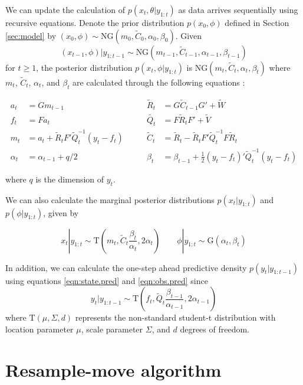\documentclass{article}
\begin{document}
We can update the calculation of $p(x_t,\theta|y_{1:t})$ as data arrives sequentially using recursive equations. Denote the prior distribution $p(x_0, \phi)$ defined in Section \ref{sec:model} by $(x_0, \phi) \sim \mbox{NG}(m_0, \tilde{C}_0, \alpha_0, \beta_0)$. Given \[(x_{t-1},\phi)|y_{1:t-1} \sim \mbox{NG}(m_{t-1},\tilde{C}_{t-1}, \alpha_{t-1}, \beta_{t-1})\]
\noindent for $t \ge 1$, the posterior distribution $p(x_t,\phi|y_{1:t})$ is $\mbox{NG}(m_t,\tilde{C}_t,\alpha_t,\beta_t)$ where $m_t$, $\tilde{C}_t$, $\alpha_t$, and $\beta_t$ are calculated through the following equations \citep{petris2009dynamic}:

\begin{align}
a_t &= Gm_{t-1} &\qquad \tilde{R}_t &= G\tilde{C}_{t-1}G' + \tilde{W} \label{eqn:state.pred} \\
f_t &= Fa_t &\qquad \tilde{Q_t} &= F\tilde{R}_tF' + \tilde{V} \label{eqn:obs.pred} \\
m_t &= a_t + \tilde{R}_tF'\tilde{Q}_t^{-1}(y_t-f_t) &\qquad \tilde{C}_t &= \tilde{R}_t - \tilde{R}_tF'\tilde{Q}_t^{-1}F\tilde{R}_t \\
\alpha_t &= \alpha_{t-1} + q / 2 &\qquad \beta_t &= \beta_{t-1} + \frac{1}{2}(y_t-f_t)'\tilde{Q}_t^{-1}(y_t-f_t)
\end{align}

\noindent where $q$ is the dimension of $y_t$.

We can also calculate the marginal posterior distributions $p(x_t|y_{1:t})$ and $p(\phi|y_{1:t})$, given by

\begin{equation}
x_t|y_{1:t} \sim \mbox{T}(m_t,\tilde{C}_t \frac{\beta_t}{\alpha_t},2\alpha_t) \qquad \phi|y_{1:t} \sim \mbox{G}(\alpha_t,\beta_t) \label{eqn:margpost}
\end{equation}

In addition, we can calculate the one-step ahead predictive density $p(y_t|y_{1:t-1})$ using equations \eqref{eqn:state.pred} and \eqref{eqn:obs.pred} since \[y_t|y_{1:t-1} \sim \mbox{T}(f_t,\tilde{Q}_t \frac{\beta_{t-1}}{\alpha_{t-1}},2\alpha_{t-1})\]
\noindent where $\mbox{T}(\mu,\Sigma,d)$ represents the non-standard student-t distribution with location parameter $\mu$, scale parameter $\Sigma$, and $d$ degrees of freedom.

\section{Resample-move algorithm} \label{sec:rm}
\end{document}
